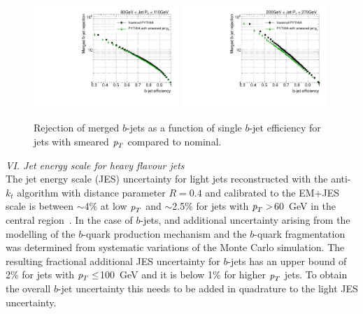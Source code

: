 \begin{figure}[tp]
\centering
\includegraphics[width=0.49\textwidth]{FIGS/systematics/LlhoodKDE_ISO_SmearedJetPt_FIXEDBUGTest_rejvseff080.pdf}
\includegraphics[width=0.49\textwidth]{FIGS/systematics/LlhoodKDE_ISO_SmearedJetPt_FIXEDBUGTest_rejvseff200.pdf}
\caption{Rejection of merged $b$-jets as a function of single $b$-jet efficiency for jets with smeared ${\emph{p}_{T}}$ compared to nominal.}
\label{fig:jetresolution}
\end{figure}


\vspace{3mm}
{ \em VI. Jet energy scale for heavy flavour jets}
\\[3mm]
The jet energy scale (JES) uncertainty for light jets reconstructed with the anti-$k_t$ algorithm with distance parameter $R=0.4$ and calibrated to the  EM+JES scale is between $\sim$4\% at low ${\emph{p}_{T}}$ and $\sim$2.5\% for jets with  ${\emph{p}_{T}} > $60~GeV in the central region~\cite{bjetJES}. In the case of $b$-jets, and additional uncertainty arising from the modelling of the $b$-quark production mechanism and the $b$-quark fragmentation was determined from systematic variations of the Monte Carlo simulation. %
The resulting fractional additional JES uncertainty for $b$-jets has an upper bound of 2\% for jets with ${\emph{p}_{T}} \leq$100~GeV and it is below 1\% for higher ${\emph{p}_{T}}$ jets. To obtain the overall $b$-jet uncertainty this needs to be added in quadrature to the light JES uncertainty. 

